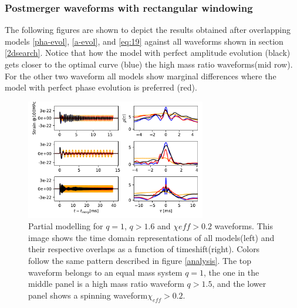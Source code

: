 %


\subsubsection*{Postmerger waveforms with rectangular windowing}

The following figures are shown to depict the results obtained after overlapping models \ref{pha-evol}, \ref{a-evol}, and \ref{eq:19} against all waveforms shown in section \ref{2dsearch}. Notice that  how the model with perfect amplitude evolution (black) gets closer to the optimal curve (blue) the high mass ratio waveforms(mid row). For the other two waveform all models show marginal differences where the model with perfect phase evolution is preferred (red).



\begin{figure}[hbt!]
\begin{center}
\includegraphics[width=0.7\textwidth, angle=0]{images/Data_analysis/results/phi-A1.pdf}
\captionsetup{width=0.8\textwidth}
\caption[Partial modelling for $q=1$, $q>1.6$ and $\chi{eff}>0.2$ waveforms]{Partial modelling for $q=1$, $q>1.6$ and $\chi{eff}>0.2$ waveforms. This image shows the time domain representations of all models(left) and their respective overlaps as a function of timeshift(right). Colors follow the same pattern described in figure \ref{analysis}. The top waveform belongs to an equal mass system $q=1$, the one in the middle panel is a high mass ratio waveform $q>1.5$, and the lower panel shows a spinning waveform$\chi_{eff}>0.2$.}
\end{center}
\end{figure}


